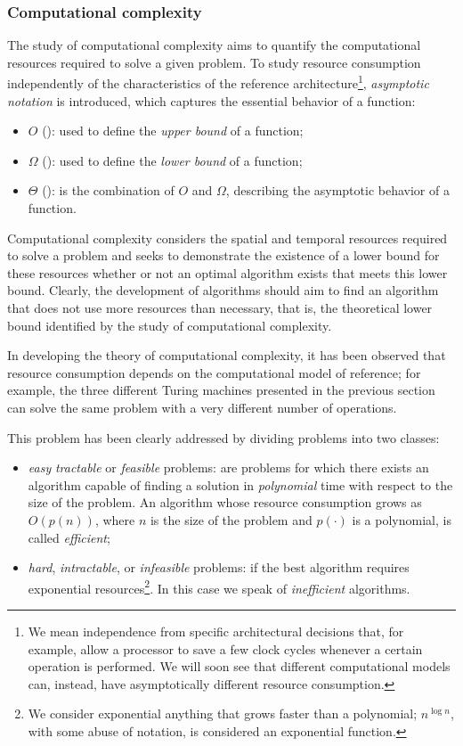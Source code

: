 \subsubsection*{Computational complexity}
The study of computational complexity aims to quantify the computational resources required to solve a given problem. To study resource consumption independently of the characteristics of the reference architecture\footnote{We mean independence from specific architectural decisions that, for example, allow a processor to save a few clock cycles whenever a certain operation is performed. We will soon see that different computational models can, instead, have asymptotically different resource consumption.}, \emph{asymptotic notation} is introduced, which captures the essential behavior of a function:
\begin{itemize}
	\item $O$ (): used to define the \emph{upper bound} of a function;
	\item $\Omega$ (): used to define the \emph{lower bound} of a function;
	\item $\Theta$ (): is the combination of $O$ and $\Omega$, describing the asymptotic behavior of a function.
\end{itemize}

Computational complexity considers the spatial and temporal resources required to solve a problem and seeks to demonstrate the existence of a lower bound for these resources whether or not an optimal algorithm exists that meets this lower bound. Clearly, the development of algorithms should aim to find an algorithm that does not use more resources than necessary, that is, the theoretical lower bound identified by the study of computational complexity.

In developing the theory of computational complexity, it has been observed that resource consumption depends on the computational model of reference; for example, the three different Turing machines presented in the previous section can solve the same problem with a very different number of operations.

This  problem has been clearly addressed by dividing problems into two classes:
\begin{itemize}
	\item \emph{easy} \emph{tractable} or \emph{feasible} problems: are problems for which there exists an algorithm capable of finding a solution in \emph{polynomial} time with respect to the size of the problem. An algorithm whose resource consumption grows as $O(p(n))$, where $n$ is the size of the problem and $p(\cdot)$ is a polynomial, is called \emph{efficient};
	\item \emph{hard}, \emph{intractable}, or \emph{infeasible} problems: if the best algorithm requires exponential resources\footnote{We consider exponential anything that grows faster than a polynomial; $n^{\log n}$, with some abuse of notation, is considered an exponential function.}. In this case we speak of \emph{inefficient} algorithms.
\end{itemize}

